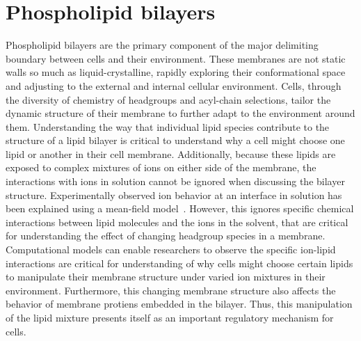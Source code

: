 \section{Phospholipid bilayers}
Phospholipid bilayers are the primary component of the major delimiting boundary between cells and their environment.
These membranes are not static walls so much as liquid-crystalline, rapidly exploring their conformational
space and adjusting to the external and internal cellular environment. Cells, through the 
diversity of chemistry of headgroups and acyl-chain selections, tailor the dynamic structure of their membrane to further
adapt to the environment around them. 
Understanding the way that individual lipid species contribute to the structure of a lipid bilayer is critical to understand
why a cell might choose one lipid or another in their cell membrane. Additionally, because these lipids are exposed to complex
mixtures of ions on either side of the membrane, the interactions with ions in solution cannot be ignored when discussing the bilayer structure. 
Experimentally observed ion behavior at an interface in solution has been explained using a mean-field model~\cite{israelachvilli:2011:intermol}.
However, this ignores specific chemical interactions between lipid molecules and the ions in the solvent, that are critical for understanding
the effect of changing headgroup species in a membrane. 
Computational models can enable researchers to observe the specific ion-lipid interactions are critical for understanding of 
why cells might choose certain lipids to manipulate their membrane structure under varied ion mixtures in their environment. Furthermore, this 
changing membrane structure also affects the behavior of membrane protiens embedded in the bilayer. Thus, this manipulation of the lipid mixture
presents itself as an important regulatory mechanism for cells.

